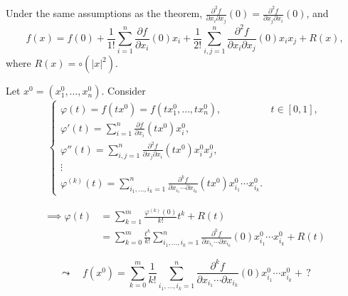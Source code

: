 \begin{corollary}
    Under the same assumptions as the theorem, $\frac{\partial^2f}{\partial x_i\partial x_j}(0)=\frac{\partial^2f}{\partial x_j\partial x_i}(0)$, and
    $$
        f(x)=f(0)+\frac{1}{1!}\sum_{i=1}^{n}\frac{\partial f}{\partial x_i}(0)x_i+\frac{1}{2!}\sum_{i,j=1}^n\frac{\partial^2f}{\partial x_i\partial x_j}(0)x_ix_j+R(x),
    $$
    where $R(x)=\circ(|x|^2)$.
\end{corollary}

Let $x^0=(x_1^0,\dots,x_n^0)$. Consider
$$
    \begin{cases}
        \varphi(t)=f(tx^0)=f(tx_1^0,\dots,tx_n^0), & t\in[0,1],                                  \\
        \varphi'(t)=\sum_{i=1}^n\frac{\partial f}{\partial x_i}(tx^0)x_i^0,                      \\
        \varphi''(t)=\sum_{i,j=1}^n\frac{\partial^2f}{\partial x_j\partial x_i}(tx^0)x_i^0x_j^0, \\
        \vdots                                                                                   \\
        \varphi^{(k)}(t)=\sum_{i_1,\dots,i_k=1}^n\frac{\partial^kf}{\partial x_{i_1}\cdots\partial x_{i_k}}(tx^0)x_{i_1}^0\cdots x_{i_k}^0.
    \end{cases}
$$

\begin{align*}
    \implies\varphi(t) & =\sum_{k=1}^m\frac{\varphi^{(k)}(0)}{k!}t^k+R(t)                                                                                               \\
                       & =\sum_{k=0}^m\frac{t^k}{k!}\sum_{i_1,\dots,i_k=1}^n\frac{\partial^kf}{\partial x_{i_1}\cdots\partial x_{i_k}}(0)x_{i_1}^0\cdots x_{i_k}^0+R(t)
\end{align*}

$$
    \leadsto\quad f(x^0)=\sum_{k=0}^m\frac{1}{k!}\sum_{i_1,\dots,i_k=1}^n\frac{\partial^kf}{\partial x_{i_1}\cdots\partial x_{i_k}}(0)x_{i_1}^0\cdots x_{i_k}^0+\,?
$$

